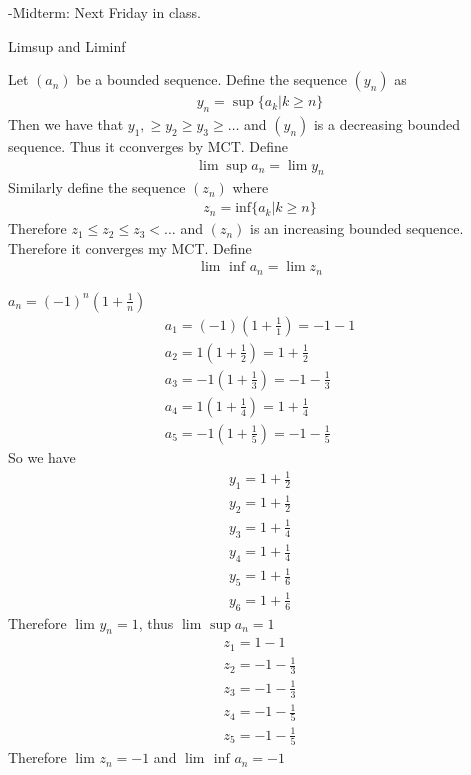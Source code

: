 
-Midterm: Next Friday in class.

Limsup and Liminf

\begin{definition} 
	Let $\left( a_n \right) $ be a bounded sequence. Define the sequence $\left( y_n \right) $ as
	\begin{align}
		y_n = \sup \{a_k | k \ge n\} 
	\end{align}
	Then we have that $y_1, \ge y_2 \ge  y_3 \ge \ldots$ and  $\left( y_n \right) $ is a decreasing bounded sequence. Thus it cconverges by MCT. Define
	\begin{align}
		\lim_{} \sup a_n = \lim_{} y_n
	\end{align}
	Similarly define the sequence $\left( z_n \right) $ where
	\begin{align}
		z_n = \text{inf}\{a_k | k \ge n\} 
	\end{align}
	Therefore $z_1 \le z_2 \le z_3 < \ldots$ and $\left( z_n \right) $ is an increasing bounded sequence. Therefore it converges my MCT. Define
	\begin{align}
		\lim_{} \text{ inf } a_n = \lim_{} z_n
	\end{align}
\end{definition}

\begin{eg}
	$a_n = \left( -1 \right)^{n} \left( 1 + \frac{1}{n} \right) $ 
	\begin{align}
		a_ 1 = \left( -1 \right) \left( 1+\frac{1}{1} \right) = -1 - 1 \\
		a_2 = 1 \left( 1 + \frac{1}{2} \right) = 1 + \frac{1}{2} \\
		a_3 = -1\left( 1 + \frac{1}{3} \right) = -1 -\frac{1}{3} \\
		a_4 = 1 \left( 1 + \frac{1}{4} \right) = 1 + \frac{1}{4} \\
		a_5 = -1\left( 1 + \frac{1}{5} \right)  = -1 - \frac{1}{5}
	\end{align}
	So we have 
	\begin{align}
		y_1 = 1 + \frac{1}{2} \\
		y_2 = 1 + \frac{1}{2} \\
		y_3 = 1 + \frac{1}{4} \\
		y_4 = 1 + \frac{1}{4} \\
		y_5 = 1 + \frac{1}{6} \\
		y_6 = 1 + \frac{1}{6}
	\end{align}
	Therefore $\lim_{} y_n = 1$, thus $\lim_{} \sup a_n = 1$
	\begin{align}
		z_1 = 1 - 1\\
		z_2 = -1 -\frac{1}{3} \\
		z_3 = -1 -\frac{1}{3} \\
		z_4 = -1 -\frac{1}{5} \\
		z_5 = -1 -\frac{1}{5}
	\end{align}
	Therefore $\lim_{} z_n = -1$ and $\lim_{} \text{ inf } a_n = -1$
\end{eg}

